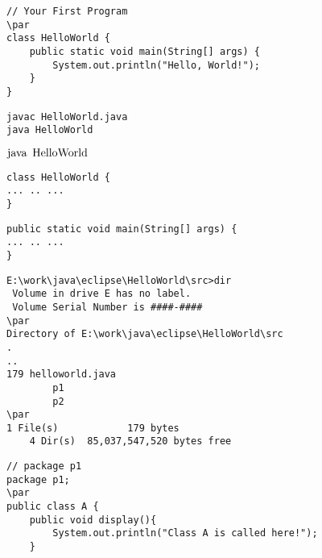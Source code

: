 \documentclass{book}
\def\lthtmlcheckvsize{\ifdim\ht\sizebox<\vsize 
  \ifdim\wd\sizebox<\hsize\expandafter\hfill\fi \expandafter\vfill
  \else\expandafter\vss\fi}%
\begin{document}
{\newpage\clearpage
{}%
\begin{lstlisting}
// Your First Program
\par
class HelloWorld {
    public static void main(String[] args) {
        System.out.println("Hello, World!"); 
    }
}
\end{lstlisting}%
\lthtmlfigureZ
\lthtmlcheckvsize\clearpage}

{\newpage\clearpage
{}%
\begin{lstlisting}
javac HelloWorld.java
java HelloWorld
\end{lstlisting}%
\lthtmlfigureZ
\lthtmlcheckvsize\clearpage}

{\newpage\clearpage
{}%
$\lstinline{java HelloWorld}$%
\lthtmlindisplaymathZ
\lthtmlcheckvsize\clearpage}

{\newpage\clearpage
{}%
\begin{lstlisting}
class HelloWorld {
... .. ...
}
\end{lstlisting}%
\lthtmlfigureZ
\lthtmlcheckvsize\clearpage}

{\newpage\clearpage
{}%
\begin{lstlisting}
public static void main(String[] args) {
... .. ...
}
\end{lstlisting}%
\lthtmlfigureZ
\lthtmlcheckvsize\clearpage}

{\newpage\clearpage
{}%
\begin{lstlisting}
E:\work\java\eclipse\HelloWorld\src>dir
 Volume in drive E has no label.
 Volume Serial Number is ####-####
\par
Directory of E:\work\java\eclipse\HelloWorld\src
.
..
179 helloworld.java
		p1
		p2
\par
1 File(s)            179 bytes
    4 Dir(s)  85,037,547,520 bytes free
\end{lstlisting}%
\lthtmlfigureZ
\lthtmlcheckvsize\clearpage}

{\newpage\clearpage
{}%
\begin{lstlisting}
// package p1 
package p1;
\par
public class A {
	public void display(){
		System.out.println("Class A is called here!");
	}	
\end{lstlisting}%
\lthtmlfigureZ
\lthtmlcheckvsize\clearpage}
\end{document}
